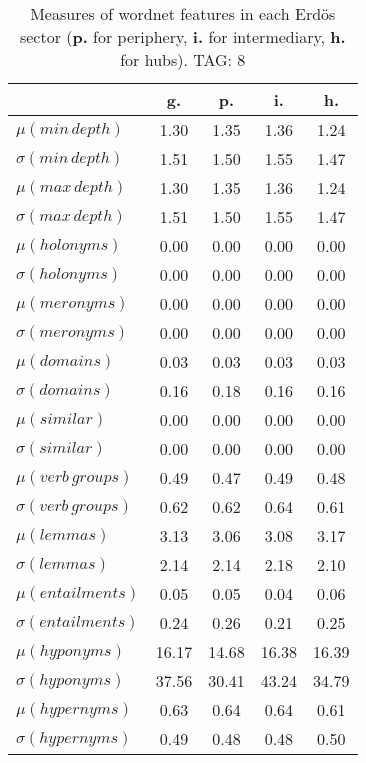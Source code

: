 \begin{table}[h!]
\begin{center}
\begin{tabular}{| l || c | c | c | c |}\hline
 & {\bf g.} & {\bf p.} & {\bf i.} & {\bf h.} \\\hline\hline
$\mu(min\,depth)$ & 1.30  & 1.35  & 1.36  & 1.24 \\
$\sigma(min\,depth)$ & 1.51  & 1.50  & 1.55  & 1.47 \\\hline
$\mu(max\,depth)$ & 1.30  & 1.35  & 1.36  & 1.24 \\
$\sigma(max\,depth)$ & 1.51  & 1.50  & 1.55  & 1.47 \\\hline
$\mu(holonyms)$ & 0.00  & 0.00  & 0.00  & 0.00 \\
$\sigma(holonyms)$ & 0.00  & 0.00  & 0.00  & 0.00 \\\hline
$\mu(meronyms)$ & 0.00  & 0.00  & 0.00  & 0.00 \\
$\sigma(meronyms)$ & 0.00  & 0.00  & 0.00  & 0.00 \\\hline
$\mu(domains)$ & 0.03  & 0.03  & 0.03  & 0.03 \\
$\sigma(domains)$ & 0.16  & 0.18  & 0.16  & 0.16 \\\hline
$\mu(similar)$ & 0.00  & 0.00  & 0.00  & 0.00 \\
$\sigma(similar)$ & 0.00  & 0.00  & 0.00  & 0.00 \\\hline
$\mu(verb\,groups)$ & 0.49  & 0.47  & 0.49  & 0.48 \\
$\sigma(verb\,groups)$ & 0.62  & 0.62  & 0.64  & 0.61 \\\hline
$\mu(lemmas)$ & 3.13  & 3.06  & 3.08  & 3.17 \\
$\sigma(lemmas)$ & 2.14  & 2.14  & 2.18  & 2.10 \\\hline
$\mu(entailments)$ & 0.05  & 0.05  & 0.04  & 0.06 \\
$\sigma(entailments)$ & 0.24  & 0.26  & 0.21  & 0.25 \\\hline
$\mu(hyponyms)$ & 16.17  & 14.68  & 16.38  & 16.39 \\
$\sigma(hyponyms)$ & 37.56  & 30.41  & 43.24  & 34.79 \\\hline
$\mu(hypernyms)$ & 0.63  & 0.64  & 0.64  & 0.61 \\
$\sigma(hypernyms)$ & 0.49  & 0.48  & 0.48  & 0.50 \\\hline
\end{tabular}
\caption{Measures of wordnet features in each Erd\"os sector ({{\bf p.}} for periphery, {{\bf i.}} for intermediary, {{\bf h.}} for hubs). TAG: 8}
\end{center}
\end{table}